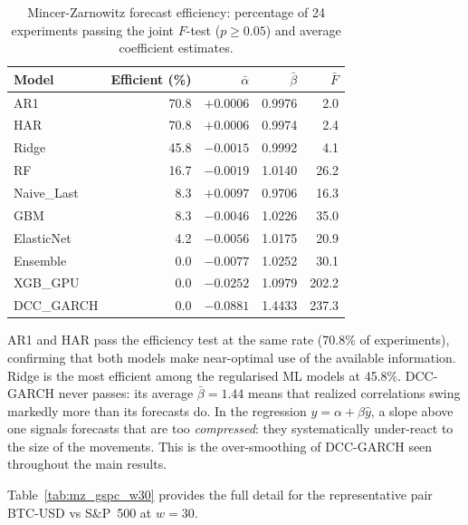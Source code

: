 \begin{table}[H]
    \centering
    \caption{Mincer-Zarnowitz forecast efficiency: percentage of 24 experiments
             passing the joint $F$-test ($p \geq 0.05$) and average coefficient estimates.}
    \label{tab:mz_summary}
    \begin{tabular}{lrrrr}
        \toprule
        Model & Efficient (\%) & $\bar{\alpha}$ & $\bar{\beta}$ & $\bar{F}$ \\
        \midrule
        AR1         & 70.8 & $+0.0006$ & 0.9976 &   2.0 \\
        HAR         & 70.8 & $+0.0006$ & 0.9974 &   2.4 \\
        Ridge       & 45.8 & $-0.0015$ & 0.9992 &   4.1 \\
        RF          & 16.7 & $-0.0019$ & 1.0140 &  26.2 \\
        Naive\_Last &  8.3 & $+0.0097$ & 0.9706 &  16.3 \\
        GBM         &  8.3 & $-0.0046$ & 1.0226 &  35.0 \\
        ElasticNet  &  4.2 & $-0.0056$ & 1.0175 &  20.9 \\
        Ensemble    &  0.0 & $-0.0077$ & 1.0252 &  30.1 \\
        XGB\_GPU    &  0.0 & $-0.0252$ & 1.0979 & 202.2 \\
        DCC\_GARCH  &  0.0 & $-0.0881$ & 1.4433 & 237.3 \\
        \bottomrule
    \end{tabular}
\end{table}

AR1 and HAR pass the efficiency test at the same rate (70.8\% of experiments),
confirming that both models make near-optimal use of the available information.
Ridge is the most efficient among the regularised ML models at 45.8\%.
DCC-GARCH never passes: its average $\bar{\beta} = 1.44$ means that realized
correlations swing markedly more than its forecasts do. In the regression
$y = \alpha + \beta\hat{y}$, a slope above one signals forecasts that are too
\emph{compressed}: they systematically under-react to the size of the
movements. This is the over-smoothing of DCC-GARCH seen throughout the main
results.

Table~\ref{tab:mz_gspc_w30} provides the full detail for the representative
pair BTC-USD vs S\&P~500 at $w = 30$.

